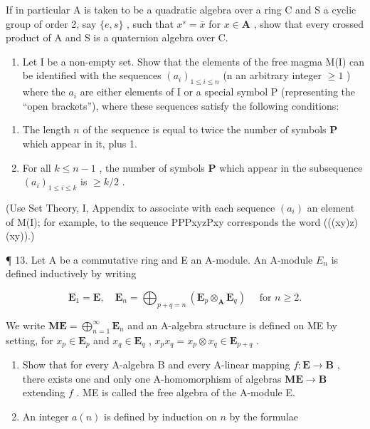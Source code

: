 If in particular A is taken to be a quadratic algebra over a ring C and S a cyclic group of order 2, say \(\{e, s\}\) , such that \(x^s = \bar{x}\) for \(x \in \mathbf{A}\) , show that every crossed product of A and S is a quaternion algebra over C.

\begin{enumerate}
\def\labelenumi{\arabic{enumi}.}
\setcounter{enumi}{11}
\tightlist
\item
  Let I be a non-empty set. Show that the elements of the free magma M(I) can be identified with the sequences \((a_{i})_{1 \leqslant i \leqslant n}\) (n an arbitrary integer \(\geqslant 1\) ) where the \(a_{i}\) are either elements of I or a special symbol P (representing the ``open brackets''), where these sequences satisfy the following conditions:
\end{enumerate}

\begin{enumerate}
\def\labelenumi{(\roman{enumi})}
\item
  The length \(n\) of the sequence is equal to twice the number of symbols \(\mathbf{P}\) which appear in it, plus 1.
\item
  For all \(k \leqslant n - 1\) , the number of symbols \(\mathbf{P}\) which appear in the subsequence \((a_i)_{1 \leqslant i \leqslant k}\) is \(\geqslant k / 2\) .
\end{enumerate}

(Use Set Theory, I, Appendix to associate with each sequence \((a_i)\) an element of M(I); for example, to the sequence PPPxyzPxy corresponds the word (((xy)z)(xy)).)

¶ 13. Let A be a commutative ring and E an A-module. An A-module \(E_{n}\) is defined inductively by writing

\[
\mathbf {E} _ {1} = \mathbf {E}, \quad \mathbf {E} _ {n} = \bigoplus_ {p + q = n} \left(\mathbf {E} _ {p} \otimes_ {\mathbf {A}} \mathbf {E} _ {q}\right) \quad \text { for } n \geqslant 2.
\]

We write \(\mathbf{ME} = \bigoplus_{n=1}^{\infty} \mathbf{E}_n\) and an A-algebra structure is defined on ME by setting, for \(x_p \in \mathbf{E}_p\) and \(x_q \in \mathbf{E}_q\) , \(x_p x_q = x_p \otimes x_q \in \mathbf{E}_{p+q}\) .

\begin{enumerate}
\def\labelenumi{(\alph{enumi})}
\item
  Show that for every A-algebra B and every A-linear mapping \(f: \mathbf{E} \to \mathbf{B}\) , there exists one and only one A-homomorphism of algebras \(\mathbf{ME} \to \mathbf{B}\) extending \(f\) . ME is called the free algebra of the A-module E.
\item
  An integer \(a(n)\) is defined by induction on \(n\) by the formulae
\end{enumerate}

